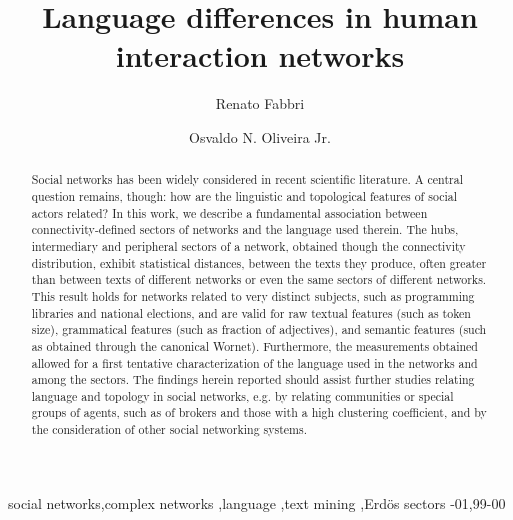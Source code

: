 \documentclass[review]{elsarticle}
\begin{document}
\begin{frontmatter}

\title{Language differences in human interaction networks}

\author[mainaddr]{Renato Fabbri}

\author[secaddr]{Osvaldo N. Oliveira Jr.}

\address[mainaddr]{Institute of Mathematics and Computer Sciences (ICMC/USP) - Avenida Trabalhador São-carlense, 400 - Centro, São Carlos, SP, Brazil}
  \address[secaddr]{São Carlos Institute of Physics (IFSC/USP) - Avenida Trabalhador São-carlense, 400 - Centro, São Carlos, 13566-590, SP, Brazil}

\begin{abstract}
  Social networks has been widely considered in recent scientific literature.
  A central question remains, though: how are the linguistic and topological features of
  social actors related?
  In this work, we describe a fundamental association between connectivity-defined sectors of networks
  and the language used therein.
  The hubs, intermediary and peripheral sectors of a network, obtained though the
  connectivity distribution, exhibit statistical distances, between the texts they produce,
  often greater than between texts of different networks or even the same sectors of different networks.
  This result holds for networks related to very distinct subjects, such as programming libraries and
  national elections, and are valid for raw textual features (such as token size),
  grammatical features (such as fraction of adjectives), and semantic features
  (such as obtained through the canonical Wornet).
  Furthermore, the measurements obtained allowed for a first tentative characterization of the language used in the networks and among the sectors.
  The findings herein reported should assist further studies relating language and topology
  in social networks, e.g. by relating communities or special groups of agents, such as of brokers
   and those with a high clustering coefficient, and by the consideration of other social networking systems.
\end{abstract}

\begin{keyword}
social networks\sep complex networks \sep language \sep text mining \sep Erdös sectors
-01\sep  99-00
\end{keyword}

\end{frontmatter}
\end{document}
